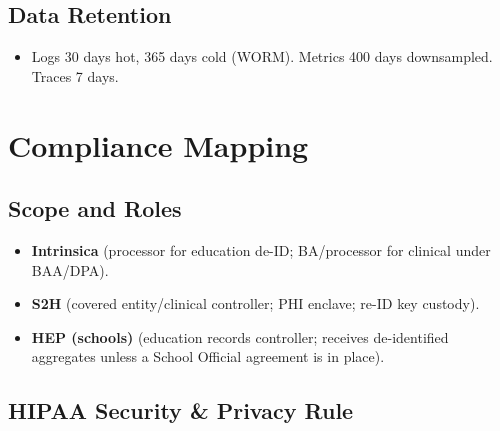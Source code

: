 \documentclass[11pt]{article}
\theoremstyle{plain}
\begin{document}
\subsection{Data Retention}
\begin{itemize}
  \item Logs 30 days hot, 365 days cold (WORM). Metrics 400 days downsampled. Traces 7 days.
\end{itemize}

\section{Compliance Mapping}

\subsection{Scope and Roles}
\begin{itemize}
  \item \textbf{Intrinsica} (processor for education de-ID; BA/processor for clinical under BAA/DPA).
  \item \textbf{S2H} (covered entity/clinical controller; PHI enclave; re-ID key custody).
  \item \textbf{HEP (schools)} (education records controller; receives de-identified aggregates unless a School Official agreement is in place).
\end{itemize}

\subsection{HIPAA Security \& Privacy Rule}
\end{document}
